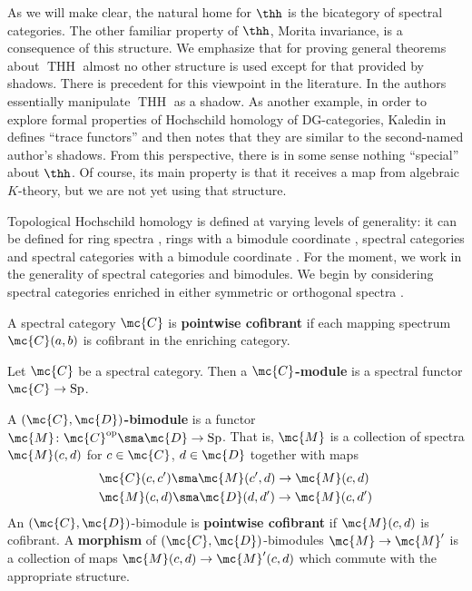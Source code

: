 \documentclass[11pt]{amsart}
\newcommand{\Sp}{\operatorname{Sp}}
\begin{document}
As we will make clear, the natural home for $\thh$ is the bicategory of spectral categories. The other familiar property of $\thh$, Morita invariance, is a consequence of this structure. We emphasize that for proving general theorems about $\operatorname{THH}$ almost no other structure is used except for that provided by shadows. There is precedent for this viewpoint in the literature. In \cite{blumberg_mandell} the authors essentially manipulate $\operatorname{THH}$ as a shadow. As another example, in order to explore formal properties of Hochschild homology of DG-categories, Kaledin in \cite{kaledin} defines ``trace functors'' and then notes that they are similar to the second-named author's shadows. From this perspective, there is in some sense nothing ``special'' about $\thh$. Of course, its main property is that it receives a map from algebraic $K$-theory, but we are not yet using that structure.

Topological Hochschild homology is defined at varying levels of generality: it can be defined for ring spectra \cite{bokstedt}, rings with a bimodule coordinate \cite{dundas_mccarthy}, spectral categories and spectral categories with a bimodule coordinate \cite{blumberg_mandell}. For the moment, we work in the generality of spectral categories and bimodules. We begin by considering spectral categories enriched in either symmetric or orthogonal spectra \cite{mandell_may_shipley_schwede}.

\begin{defn} 
	A spectral category $\mc{C}$ is \textbf{pointwise cofibrant} if each mapping spectrum $\mc{C}(a, b)$ is cofibrant in the enriching category.
\end{defn}

\begin{defn}
	Let $\mc{C}$ be a spectral category. Then a $\mc{C}$\textbf{-module} is a spectral functor $\mc{C} \to \Sp$. 
\end{defn}

\begin{defn}
  A \textbf{$(\mc{C}, \mc{D})$-bimodule} is a functor $\mc{M}\colon  \mc{C}^{\text{op}} \sma \mc{D} \to \Sp$. That is, $\mc{M}$ is a collection of spectra $\mc{M}(c, d)$ for $c \in \mc{C}$, $d \in \mc{D}$ together with maps
  \begin{align*}
    &\mc{C}(c, c') \sma \mc{M}(c', d) \to \mc{M}(c, d)\\
    &\mc{M}(c, d) \sma \mc{D}(d,d') \to \mc{M}(c, d') 
  \end{align*}
  An $(\mc{C}, \mc{D})$-bimodule is {\bf pointwise cofibrant} if $\mc{M}(c, d)$ is cofibrant. A {\bf morphism} of $(\mc{C}, \mc{D})$-bimodules $\mc{M} \to \mc{M}'$ is a collection of maps $\mc{M}(c, d) \to \mc{M}'(c, d)$ which commute with the appropriate structure. 
\end{defn}
\end{document}
